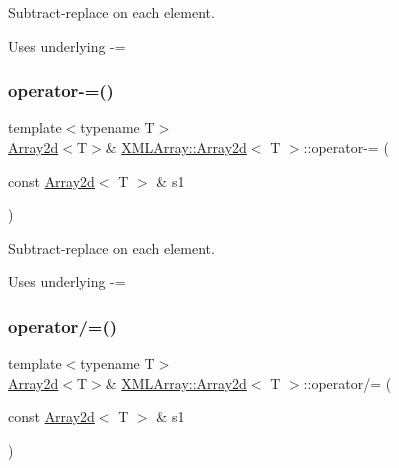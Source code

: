 Subtract-\/replace on each element. 

Uses underlying -\/= \mbox{\label{classXMLArray_1_1Array2d_aaeb259530dba3f189e129c935391d92a}} 
\subsubsection{\texorpdfstring{operator-\/=()}{operator-=()}\hspace{0.1cm}{\footnotesize\ttfamily [3/3]}}
{\footnotesize\ttfamily template$<$typename T$>$ \\
\mbox{\hyperlink{classXMLArray_1_1Array2d}{Array2d}}$<$T$>$\& \mbox{\hyperlink{classXMLArray_1_1Array2d}{X\+M\+L\+Array\+::\+Array2d}}$<$ T $>$\+::operator-\/= (\begin{DoxyParamCaption}\item[{const \mbox{\hyperlink{classXMLArray_1_1Array2d}{Array2d}}$<$ T $>$ \&}]{s1 }\end{DoxyParamCaption})\hspace{0.3cm}{\ttfamily [inline]}}



Subtract-\/replace on each element. 

Uses underlying -\/= \mbox{\label{classXMLArray_1_1Array2d_a704df3d7442ab68977e0caa8f8f059cd}} 
\subsubsection{\texorpdfstring{operator/=()}{operator/=()}\hspace{0.1cm}{\footnotesize\ttfamily [1/6]}}
{\footnotesize\ttfamily template$<$typename T$>$ \\
\mbox{\hyperlink{classXMLArray_1_1Array2d}{Array2d}}$<$T$>$\& \mbox{\hyperlink{classXMLArray_1_1Array2d}{X\+M\+L\+Array\+::\+Array2d}}$<$ T $>$\+::operator/= (\begin{DoxyParamCaption}\item[{const \mbox{\hyperlink{classXMLArray_1_1Array2d}{Array2d}}$<$ T $>$ \&}]{s1 }\end{DoxyParamCaption})\hspace{0.3cm}{\ttfamily [inline]}}



